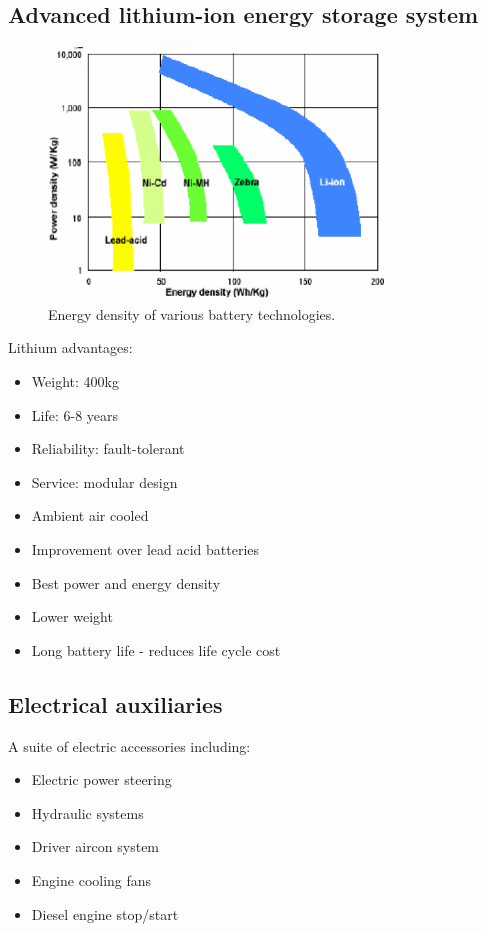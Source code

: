 \subsection{Advanced lithium-ion energy storage system}
\begin{figure}[H]
    \centering
    \includegraphics[width = 0.8\textwidth]{img/figure104.png}
    \caption{Energy density of various battery technologies.}
\end{figure}
Lithium advantages:
\begin{itemize}
    \item Weight: 400kg
    \item Life: 6-8 years
    \item Reliability: fault-tolerant
    \item Service: modular design
\end{itemize}
\begin{itemize}
    \item Ambient air cooled
    \item Improvement over lead acid batteries
    \item Best power and energy density
    \item Lower weight
    \item Long battery life - reduces life cycle cost
\end{itemize}
\subsection{Electrical auxiliaries}
A suite of electric accessories including:
\begin{itemize}
    \item Electric power steering
    \item Hydraulic systems
    \item Driver aircon system
    \item Engine cooling fans
    \item Diesel engine stop/start
\end{itemize}
